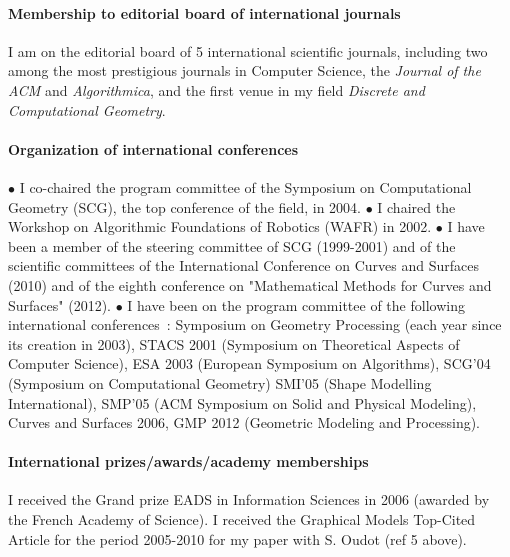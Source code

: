 \paragraph{Membership to editorial board of international journals}   \mbox{}


I am on the editorial board of 5 international scientific journals, including two among the most prestigious  journals in Computer Science, the {\em Journal of the ACM} and  {\em Algorithmica}, and the first venue in my field {\em Discrete and Computational Geometry}. 




\paragraph{Organization of international conferences} \mbox{}


$\bullet$ I co-chaired the program committee of the  Symposium on Computational Geometry (SCG), the top conference of the field,  in 2004.
$\bullet$ 
I chaired the Workshop on Algorithmic Foundations of Robotics (WAFR) in 2002.
$\bullet$ 
I have been a member of the steering committee of SCG (1999-2001) and of the scientific committees of the International Conference on Curves and Surfaces (2010) and of  the eighth conference on "Mathematical Methods for Curves and Surfaces" (2012).
$\bullet$ 
I have been on the program committee of  the following international conferences~: Symposium on Geometry Processing (each year since its creation in 2003), 
STACS 2001 (Symposium on Theoretical Aspects of Computer Science),
ESA 2003 (European Symposium on Algorithms),
SCG'04 (Symposium on Computational Geometry)
SMI'05 (Shape Modelling International),
SMP'05 (ACM Symposium on Solid and Physical Modeling),
Curves and Surfaces 2006,
GMP 2012 (Geometric Modeling 
and Processing).

\paragraph{International prizes/awards/academy memberships} \mbox{}
I received the Grand prize EADS in Information Sciences in 2006 (awarded by the French Academy of Science).  I received the Graphical Models Top-Cited Article for the period 2005-2010 for  my paper with S. Oudot (ref 5 above).

